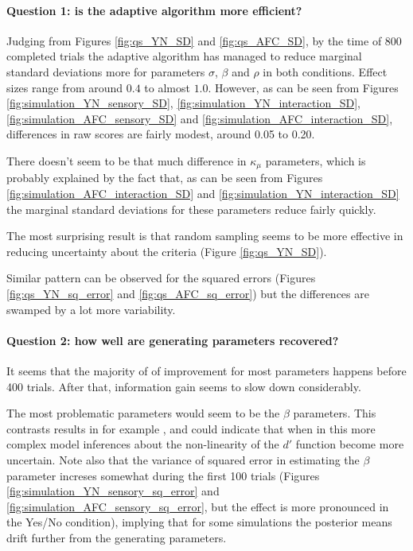 \documentclass{article}\usepackage{knitr}
\begin{document}
\paragraph{Question 1: is the adaptive algorithm more efficient?}

Judging from Figures \ref{fig:qs_YN_SD} and \ref{fig:qs_AFC_SD}, by the time of 800 completed trials the adaptive algorithm has managed to reduce marginal standard deviations more for parameters $\sigma$, $\beta$ and $\rho$ in both conditions. Effect sizes range from around $0.4$ to almost $1.0$. However, as can be seen from Figures \ref{fig:simulation_YN_sensory_SD}, \ref{fig:simulation_YN_interaction_SD}, \ref{fig:simulation_AFC_sensory_SD} and \ref{fig:simulation_AFC_interaction_SD}, differences in raw scores are fairly modest, around 0.05 to 0.20.

There doesn't seem to be that much difference in $\kappa_{\mu}$ parameters, which is probably explained by the fact that, as can be seen from Figures \ref{fig:simulation_AFC_interaction_SD} and \ref{fig:simulation_YN_interaction_SD} the marginal standard deviations for these parameters reduce fairly quickly.

The most surprising result is that random sampling seems to be more effective in reducing uncertainty about the criteria (Figure \ref{fig:qs_YN_SD}). 

Similar pattern can be observed for the squared errors (Figures \ref{fig:qs_YN_sq_error} and \ref{fig:qs_AFC_sq_error}) but the differences are swamped by a lot more variability. 

\paragraph{Question 2: how well are generating parameters recovered?}

It seems that the majority of of improvement for most parameters happens before 400 trials. After that, information gain seems to slow down considerably.

The most problematic parameters would seem to be the $\beta$ parameters. This contrasts results in for example \cite{kontsevichtyler1999}, and could indicate that when in this more complex model inferences about the non-linearity of the $d'$ function become more uncertain. Note also that the variance of squared error in estimating the $\beta$ parameter increses somewhat during the first 100 trials (Figures \ref{fig:simulation_YN_sensory_sq_error} and \ref{fig:simulation_AFC_sensory_sq_error}, but the effect is more pronounced in the Yes/No condition), implying that for some simulations the posterior means drift further from the generating parameters. 
\end{document}
